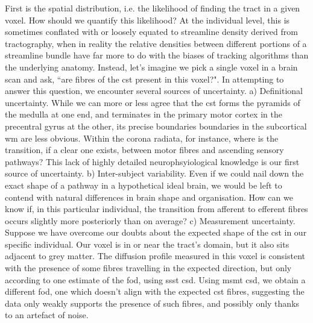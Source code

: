 First is the spatial distribution, i.e. the likelihood of finding the tract in a given voxel.
How should we quantify this likelihood?
At the individual level, this is sometimes conflated with or loosely equated to streamline density derived from tractography, when in reality the relative densities between different portions of a streamline bundle have far more to do with the biases of tracking algorithms than the underlying anatomy.
Instead, let's imagine we pick a single \gls{voxel} in a brain scan and ask, ``are fibres of the \gls{cst} present in this voxel?".
In attempting to answer this question, we encounter several sources of uncertainty.
a) Definitional uncertainty.
While we can more or less agree that the \gls{cst} forms the pyramids of the medulla at one end, and terminates in the primary motor cortex in the precentral gyrus at the other, its precise boundaries boundaries in the subcortical \gls{wm} are less obvious.
Within the corona radiata, for instance, where is the transition, if a clear one exists, between motor fibres and ascending sensory pathways?
This lack of highly detailed neurophsyiological knowledge is our first source of uncertainty.
b) Inter-subject variability.
Even if we could nail down the exact shape of a pathway in a hypothetical ideal brain, we would be left to contend with natural differences in brain shape and organisation.
How can we know if, in this particular individual, the transition from afferent to efferent fibres occurs slightly more posteriorly than on average?
c) Measurement uncertainty.
Suppose we have overcome our doubts about the expected shape of the \gls{cst} in our specific individual.
Our voxel is in or near the tract's domain, but it also sits adjacent to grey matter.
The diffusion profile measured in this voxel is consistent with the presence of some fibres travelling in the expected direction, but only according to one estimate of the \gls{fod}, using \gls{ssst} \gls{csd}.
Using \gls{msmt} \gls{csd}, we obtain a different \gls{fod}, one which doesn't align with the expected \gls{cst} fibres, suggesting the data only weakly supports the presence of such fibres, and possibly only thanks to an artefact of noise.


